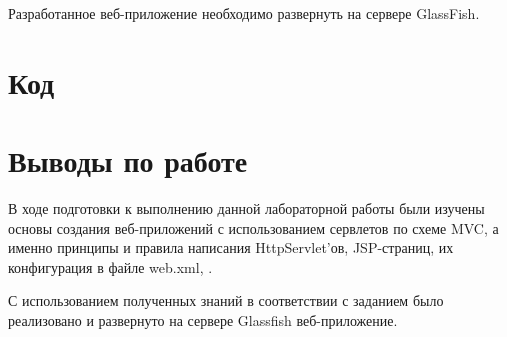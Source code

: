 \documentclass[a4paper, 12pt]{article}
\begin{document}
Разработанное веб-приложение необходимо развернуть на сервере GlassFish.


\section{Код}








\section{Выводы по работе}
В ходе подготовки к выполнению данной лабораторной работы были изучены основы создания веб-приложений с использованием сервлетов по схеме MVC, а именно принципы и правила написания HttpServlet'ов, JSP-страниц, их конфигурация в файле web.xml, .

С использованием полученных знаний в соответствии с заданием было реализовано и развернуто на сервере Glassfish веб-приложение. 
\end{document}
